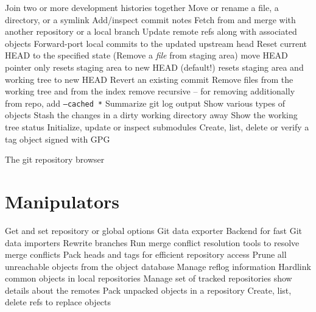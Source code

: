 	{Join two or more development histories together}
	{Move or rename a file, a directory, or a symlink}
	{Add/inspect commit notes}
	{Fetch from and merge with another re\-pository or a local branch}
	{Update remote refs along with associated objects}
	{Forward-port local commits to the updated upstream head}
	{Reset current HEAD to the specified state (Remove a {\it file} from staging area)}
	{move HEAD pointer only}
	{resets staging area to new HEAD (default!)}
	{resets staging area and working tree to new HEAD}
	{Revert an existing commit}
	{Remove files from the working tree and from the index}
	{remove recursive -- for removing additionally from repo, add
{\tt --cached *}}
	{Summarize git log output}
	{Show various types of objects}
	{Stash the changes in a dirty working directory away}
	{Show the working tree status}
	{Initialize, update or inspect submodules}
	{Create, list, delete or verify a tag object signed with GPG}

	{The git repository browser}

\section{Manipulators}
	{Get and set repository or global options}
	{Git data exporter}
	{Backend for fast Git data importers}
	{Rewrite branches}
	{Run merge conflict resolution tools to resolve merge conflicts}
	{Pack heads and tags for efficient repository access}
	{Prune all unreachable objects from the object database}
	{Manage reflog information}
	{Hardlink common objects in local repositories}
	{Manage set of tracked repositories}
	{show details about the remotes}
	{Pack unpacked objects in a repository}
	{Create, list, delete refs to replace objects}

